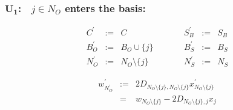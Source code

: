\documentclass[a4paper]{article}
\begin{document}
\subsubsection{$\mathbf{U_{1}}$:$\quad j \in N_{O}$ enters the basis:}
\begin{equation}
\label{update:original_enters_basis}
\begin{array}{ccccccc}
C^{\prime}      &:=&  C
&\quad\quad&
S_{B}^{\prime}  &:=&  S_{B}   \\
B_{O}^{\prime}  &:=&  B_{O} \cup \{j\}
&\quad\quad&
B_{S}^{\prime}  &:=&  B_{S}   \\
N_{O}^{\prime}  &:=&  N_{O} \setminus \{j\}
&\quad\quad&
N_{S}^{\prime}  &:=&  N_{S} 
\end{array}
\end{equation}

\begin{eqnarray}
w_{N_{O}^{\prime}}^{\prime}
&:=&
2D_{N_{O} \setminus \{j\}, N_{O} \setminus \{j\}}
x_{N_{O} \setminus \{j\}}^{\prime}
\nonumber \\
&=&
w_{N_{O} \setminus \{j\}} - 2D_{N_{O} \setminus \{j\}, j}x_{j}
\end{eqnarray}
\end{document}
